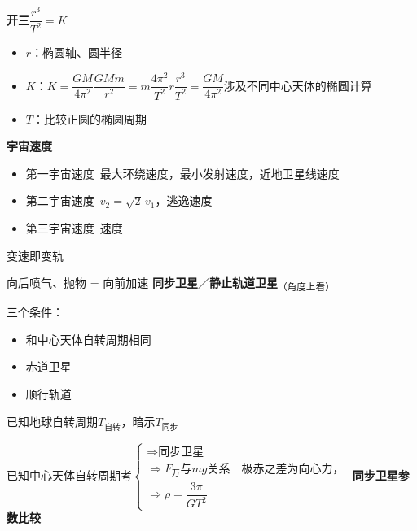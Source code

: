 \textbf{开三}\quad $\dfrac{r^{3}}{T^{2}}=K$
\begin{itemize}
\item $r$：椭圆轴、圆半径
\item $K$：$K=\dfrac{GM}{4\pi^{2}}$\quad $\dfrac{GMm}{r^{2}}=m\dfrac{4\pi^{2}}{T^{2}}r$\quad $\dfrac{r^{3}}{T^{2}}=\dfrac{GM}{4\pi^{2}}$\quad 涉及不同中心天体的椭圆计算
\item $T$：比较正圆的椭圆周期
\end{itemize}
\textbf{宇宙速度}
\begin{itemize}
\item 第一宇宙速度\ 最大环绕速度，最小发射速度，近地卫星线速度
\item 第二宇宙速度\ $v_2=\sqrt{2}\,v_1$，逃逸速度
\item 第三宇宙速度\ 速度
\end{itemize}
变速即变轨

向后喷气、抛物 = 向前加速
\textbf{同步卫星}／\textbf{静止轨道卫星}\textsubscript{（角度上看）}

三个条件：
\begin{itemize}
\item 和中心天体自转周期相同
\item 赤道卫星
\item 顺行轨道
\end{itemize}

已知地球自转周期$T_{\text{自转}}$，暗示$T_{\text{同步}}$%

已知中心天体自转周期\quad 考$\left\{\begin{array}{l}
\Rightarrow\text{同步卫星}\\
\Rightarrow F_{\text{万}}\text{与}mg\text{关系}\quad\text{极赤之差为向心力，}\\
\Rightarrow\rho=\dfrac{3\pi}{GT^{2}}
\end{array}\right.$
\textbf{同步卫星参数比较}

